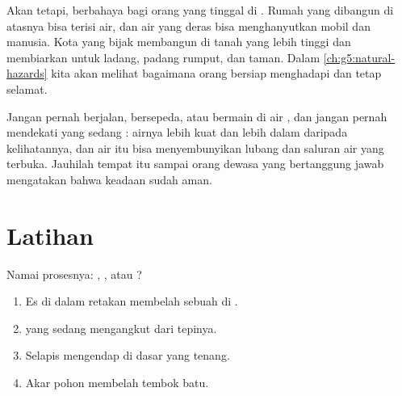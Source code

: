 Akan tetapi,  berbahaya bagi orang yang tinggal di .
Rumah yang dibangun di atasnya bisa terisi air, dan air  yang deras
bisa menghanyutkan mobil dan manusia. Kota yang bijak membangun di tanah
yang lebih tinggi dan membiarkan  untuk ladang, padang
rumput, dan taman. Dalam \cref{ch:g5:natural-hazards} kita akan melihat
bagaimana orang bersiap menghadapi  dan tetap selamat.

\begin{safety}
Jangan pernah berjalan, bersepeda, atau bermain di air , dan jangan
pernah mendekati  yang sedang : airnya lebih kuat dan lebih
dalam daripada kelihatannya, dan air itu bisa menyembunyikan lubang dan
saluran air yang terbuka. Jauhilah tempat itu sampai orang dewasa yang
bertanggung jawab mengatakan bahwa keadaan sudah aman.
\end{safety}

\section{Latihan}

\begin{exercise}[$\star$]\label{exo:g5:water-shapes-the-land:1}
Namai prosesnya: , , atau ?
\begin{enumerate}
  \item[(a)] Es di dalam retakan membelah sebuah  di .
  \item[(b)]  yang sedang  mengangkut  dari tepinya.
  \item[(c)] Selapis  mengendap di dasar  yang tenang.
  \item[(d)] Akar pohon membelah tembok batu.
\end{enumerate}
\end{exercise}

